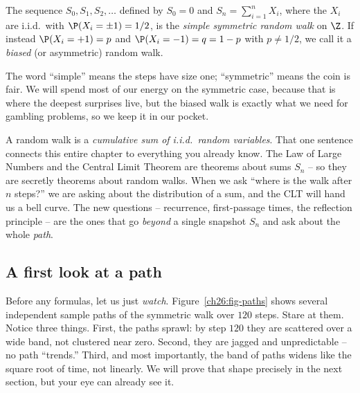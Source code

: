 \begin{definition}
\label{ch26:def-srw}
The sequence $S_0, S_1, S_2, \dots$ defined by $S_0 = 0$ and
$S_n = \sum_{i=1}^n X_i$, where the $X_i$ are i.i.d.\ with
$\P(X_i = \pm 1) = 1/2$, is the \emph{simple symmetric random walk} on $\Z$.
If instead $\P(X_i = +1) = p$ and $\P(X_i = -1) = q = 1-p$ with $p \neq 1/2$,
we call it a \emph{biased} (or asymmetric) random walk.
\end{definition}

The word ``simple'' means the steps have size one; ``symmetric'' means the coin
is fair. We will spend most of our energy on the symmetric case, because that
is where the deepest surprises live, but the biased walk is exactly what we
need for gambling problems, so we keep it in our pocket.

\begin{happeningbox}
A random walk is a \emph{cumulative sum of i.i.d.\ random variables}. That one
sentence connects this entire chapter to everything you already know. The
Law of Large Numbers and the Central Limit Theorem are theorems about sums
$S_n$ -- so they are secretly theorems about random walks. When we ask ``where
is the walk after $n$ steps?'' we are asking about the distribution of a sum,
and the CLT will hand us a bell curve. The new questions -- recurrence,
first-passage times, the reflection principle -- are the ones that go
\emph{beyond} a single snapshot $S_n$ and ask about the whole \emph{path}.
\end{happeningbox}

\subsection{A first look at a path}

Before any formulas, let us just \emph{watch}. Figure~\ref{ch26:fig-paths}
shows several independent sample paths of the symmetric walk over $120$ steps.
Stare at them. Notice three things. First, the paths sprawl: by step $120$ they
are scattered over a wide band, not clustered near zero. Second, they are
jagged and unpredictable -- no path ``trends.'' Third, and most importantly,
the band of paths widens like the square root of time, not linearly. We will
prove that shape precisely in the next section, but your eye can already see
it.


